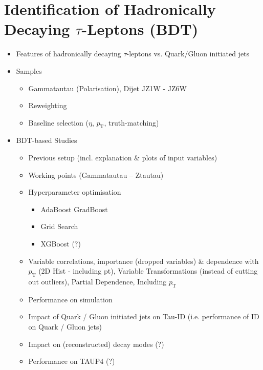 \chapter{Identification of Hadronically Decaying $\tau$-Leptons (BDT)}
\label{sec:bdt}


\begin{itemize}
\item Features of hadronically decaying $\tau$-leptons vs. Quark/Gluon
  initiated jets

\item Samples
  \begin{itemize}
  \item Gammatautau (Polarisation), Dijet JZ1W - JZ6W
  \item Reweighting
  \item Baseline selection ($\eta$, $p_\mathrm{T}$, truth-matching)
  \end{itemize}

\item BDT-based Studies
  \begin{itemize}
  \item Previous setup (incl. explanation \& plots of input variables)
  \item Working points (Gammatautau -- Ztautau)
  \item Hyperparameter optimisation
    \begin{itemize}
    \item AdaBoost \textrightarrow GradBoost
    \item Grid Search
    \item XGBoost (?)
    \end{itemize}
  \item Variable correlations, importance (dropped variables) \& dependence with
    $p_\mathrm{T}$ (2D Hist - including pt), Variable Transformations (instead
    of cutting out outliers), Partial Dependence, Including $p_\mathrm{T}$
  \item Performance on simulation
  \item Impact of Quark / Gluon initiated jets on Tau-ID (i.e. performance of ID
    on Quark / Gluon jets)
  \item Impact on (reconstructed) decay modes (?)
  \item Performance on TAUP4 (?)
  \end{itemize}
\end{itemize}

